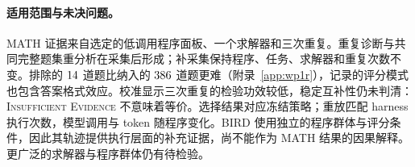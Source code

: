 \paragraph{适用范围与未决问题。}
MATH 证据来自选定的低调用程序面板、一个求解器和三次重复。重复诊断与共同完整题集重分析在采集后形成；补采集保持程序、任务、求解器和重复次数不变。排除的 $14$ 道题比纳入的 $386$ 道题更难（附录~\ref{app:wp1r}），记录的评分模式也包含答案格式效应。校准显示三次重复的检验功效较低，稳定互补性仍未判清：\textsc{Insufficient Evidence} 不意味着等价。选择结果对应冻结策略；重放匹配 harness 执行次数，模型调用与 token 随程序变化。BIRD 使用独立的程序群体与评分条件，因此其轨迹提供执行层面的补充证据，尚不能作为 MATH 结果的因果解释。更广泛的求解器与程序群体仍有待检验。
